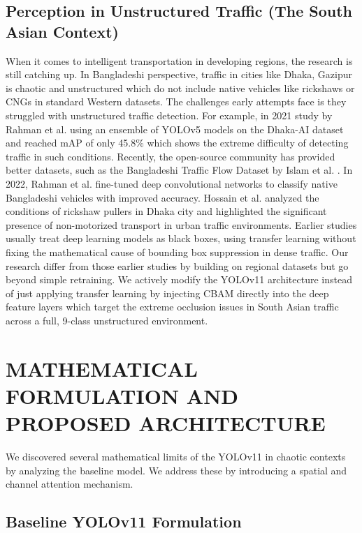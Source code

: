 \documentclass[sigconf]{acmart}
\begin{document}
\subsection{Perception in Unstructured Traffic (The South Asian Context)}
When it comes to intelligent transportation in developing regions, the research is still catching up. In Bangladeshi perspective, traffic in cities like Dhaka, Gazipur is chaotic and unstructured which do not include native vehicles like rickshaws or CNGs in standard Western datasets. The challenges early attempts face is they struggled with unstructured traffic detection. For example, in 2021 study by Rahman et al.\cite{rahman2021densely} using an ensemble of YOLOv5 models on the Dhaka-AI dataset and reached mAP of only 45.8\% which shows the extreme difficulty of detecting traffic in such conditions. Recently, the open-source community has provided better datasets, such as the Bangladeshi Traffic Flow Dataset by Islam et al. \cite{Islam2025BangladeshiTrafficFlow}. In 2022, Rahman et al.\cite{rahman2022fine} fine-tuned deep convolutional networks to classify native Bangladeshi vehicles with improved accuracy. Hossain et al.\cite{17a} analyzed the conditions of rickshaw pullers in Dhaka city and highlighted the significant presence of non-motorized transport in urban traffic environments. Earlier studies usually treat deep learning models as black boxes, using transfer learning without fixing the mathematical cause of bounding box suppression in dense traffic. Our research differ from those earlier studies by building on regional datasets but go beyond simple retraining. We actively modify the YOLOv11 architecture instead of just applying transfer learning by injecting CBAM directly into the deep feature layers which target the extreme occlusion issues in South Asian traffic across a full, 9-class unstructured environment.

\section{MATHEMATICAL FORMULATION AND PROPOSED ARCHITECTURE}
We discovered several mathematical limits of the YOLOv11 in chaotic contexts by analyzing the baseline model. We address these by introducing a spatial and channel attention mechanism. 


\subsection{Baseline YOLOv11 Formulation}
\end{document}
